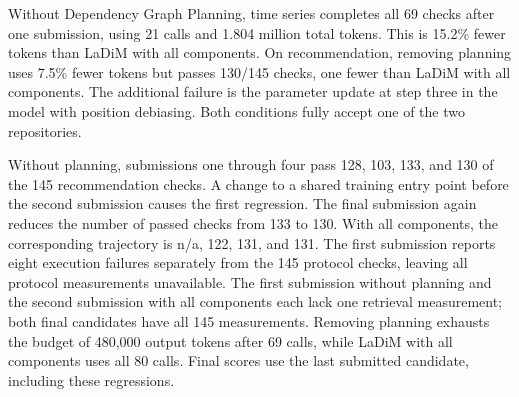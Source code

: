 Without Dependency Graph Planning, time series completes all 69 checks after one submission, using 21 calls and 1.804 million total tokens. This is 15.2\% fewer tokens than LaDiM with all components. On recommendation, removing planning uses 7.5\% fewer tokens but passes 130/145 checks, one fewer than LaDiM with all components. The additional failure is the parameter update at step three in the model with position debiasing. Both conditions fully accept one of the two repositories.

Without planning, submissions one through four pass 128, 103, 133, and 130 of the 145 recommendation checks. A change to a shared training entry point before the second submission causes the first regression. The final submission again reduces the number of passed checks from 133 to 130. With all components, the corresponding trajectory is n/a, 122, 131, and 131. The first submission reports eight execution failures separately from the 145 protocol checks, leaving all protocol measurements unavailable. The first submission without planning and the second submission with all components each lack one retrieval measurement; both final candidates have all 145 measurements. Removing planning exhausts the budget of 480,000 output tokens after 69 calls, while LaDiM with all components uses all 80 calls. Final scores use the last submitted candidate, including these regressions.

